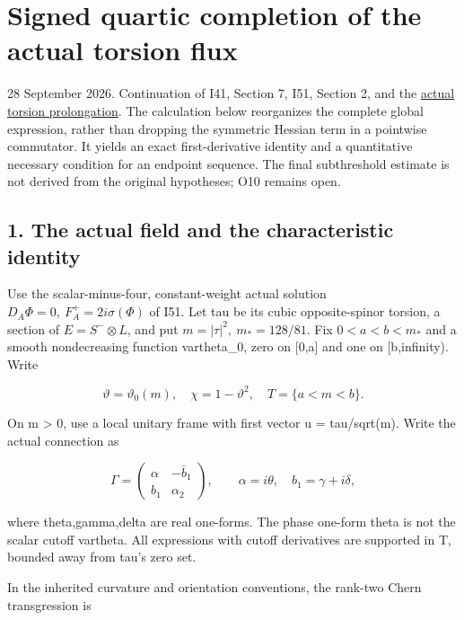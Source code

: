 \documentclass[
  10pt,
]{article}
\author{}
\date{}
\begin{document}
\hypertarget{signed-quartic-completion-of-the-actual-torsion-flux}{%
\section{Signed quartic completion of the actual torsion
flux}\label{signed-quartic-completion-of-the-actual-torsion-flux}}

28 September 2026. Continuation of I41, Section 7, I51, Section 2, and
the \href{20260928_actual_torsion_prolongation.md}{actual torsion
prolongation}. The calculation below reorganizes the complete global
expression, rather than dropping the symmetric Hessian term in a
pointwise commutator. It yields an exact first-derivative identity and a
quantitative necessary condition for an endpoint sequence. The final
subthreshold estimate is not derived from the original hypotheses; O10
remains open.

\hypertarget{the-actual-field-and-the-characteristic-identity}{%
\subsection{1. The actual field and the characteristic
identity}\label{the-actual-field-and-the-characteristic-identity}}

Use the scalar-minus-four, constant-weight actual solution
\(D_A\Phi=0,\ F_A^+=2i\sigma(\Phi)\) of I51. Let tau be its cubic
opposite-spinor torsion, a section of \(E=S^-\otimes L\), and put
\(m=|\tau|^2,\ m_*=128/81\). Fix \(0<a<b<m_*\) and a smooth
nondecreasing function vartheta\_0, zero on {[}0,a{]} and one on
{[}b,infinity). Write

\[
 \vartheta=\vartheta_0(m),\quad \chi=1-\vartheta^2,\quad
                         T=\{a<m<b\}.
\]

On m \textgreater{} 0, use a local unitary frame with first vector u =
tau/sqrt(m). Write the actual connection as

\[
 \Gamma=\begin{pmatrix}\alpha&-\bar b_1\\b_1&\alpha_2\end{pmatrix},
 \qquad \alpha=i\theta,\quad b_1=\gamma+i\delta,
\]

where theta,gamma,delta are real one-forms. The phase one-form theta is
not the scalar cutoff vartheta. All expressions with cutoff derivatives
are supported in T, bounded away from tau's zero set.

In the inherited curvature and orientation conventions, the rank-two
Chern transgression is
\end{document}
